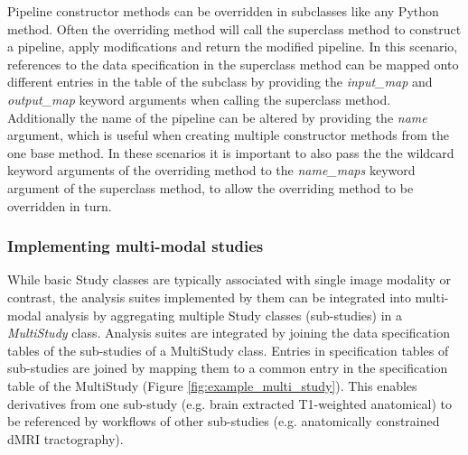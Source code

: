 \documentclass[smallextended]{svjour3}       %
\begin{document}
Pipeline constructor methods can be overridden in subclasses like any Python
method. Often the overriding method will call the superclass method
to construct a pipeline, apply modifications and return the
modified pipeline. In this scenario, references to the data
specification in the superclass method can be mapped onto different
entries in the table of the subclass by providing the \emph{input\_map} and
\emph{output\_map} keyword arguments when calling the superclass method.
Additionally the name of the pipeline can be altered by providing the \emph{name}
argument, which is useful when creating multiple  constructor methods from the
one base method. In these scenarios it is important to
also pass the the wildcard keyword arguments of the overriding method to the
\emph{name\_maps} keyword argument of the superclass method, to allow the
overriding method to be overridden in turn.


\subsubsection*{Implementing multi-modal studies}
\label{implementing-multi-modal-studies}

While basic Study classes are typically associated with single image
modality or contrast, the analysis suites implemented by them can be
integrated into multi-modal analysis by aggregating multiple Study
classes (sub-studies) in a \emph{MultiStudy} class. Analysis suites are
integrated by joining the data specification tables of the sub-studies
of a MultiStudy class. Entries in specification tables of sub-studies
are joined by mapping them to a common entry in the specification table
of the MultiStudy (Figure \ref{fig:example_multi_study}). This enables derivatives from one
sub-study (e.g. brain extracted T1-weighted anatomical) to be referenced
by workflows of other sub-studies (e.g. anatomically constrained dMRI
tractography).
\end{document}
